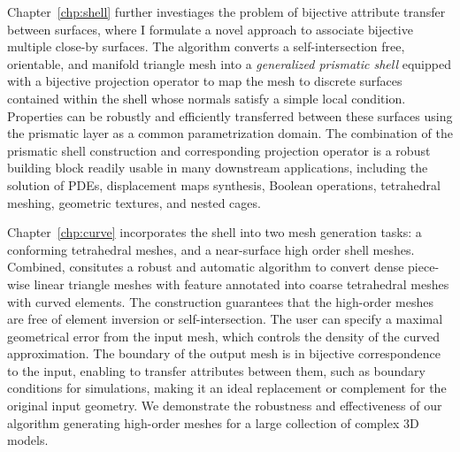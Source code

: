 Chapter~\ref*{chp:shell} further investiages the problem of bijective attribute transfer between surfaces, where I formulate a novel approach to associate bijective multiple close-by surfaces. The algorithm converts a self-intersection free, orientable, and manifold triangle mesh into a \emph{generalized prismatic shell} equipped with a bijective projection operator to map the mesh to  discrete surfaces contained within the shell whose normals satisfy a simple local condition. 
Properties can be robustly and efficiently transferred between these surfaces using the prismatic layer as a common parametrization domain. 
The combination of the prismatic shell construction and corresponding projection operator is a robust building block readily usable in many downstream applications, including the solution of PDEs, displacement maps synthesis, Boolean operations, tetrahedral meshing, geometric textures, and nested cages.

%

Chapter~\ref*{chp:curve} incorporates the  shell into two mesh generation tasks: a conforming tetrahedral meshes, and a near-surface high order shell meshes. Combined, consitutes a robust and automatic algorithm to convert dense piece-wise linear triangle meshes with feature annotated into coarse tetrahedral meshes with curved elements. The construction guarantees that the high-order meshes are free of element inversion or self-intersection. 
The user can specify a maximal geometrical error from the input mesh, which  controls the density of the curved approximation. The boundary of the output mesh is in bijective correspondence to the input, enabling to transfer attributes between them, such as boundary conditions for simulations, making it an ideal replacement or complement for the original input geometry. We demonstrate the robustness and effectiveness of our algorithm generating high-order meshes for a large collection of complex 3D models.

